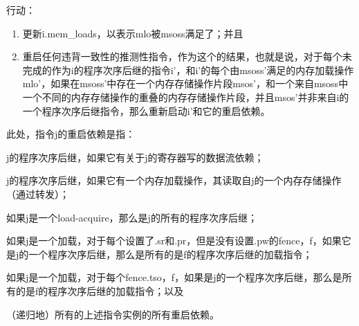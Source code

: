 行动：
\begin{enumerate}
\item 更新i.mem_loads，以表示mlo被msoss满足了；并且
\item 重启任何违背一致性的推测性指令，作为这个的结果，也就是说，对于每个未完成的作为i的程序次序后继的指令i’，和i’的每个由msoss’满足的内存加载操作mlo’，如果在msoss’中存在一个内存存储操作片段msos’，和一个来自msoss中一个不同的内存存储操作的重叠的内存存储操作片段，并且msos’并非来自i的一个程序次序后继指令，那么重新启动i’和它的重启依赖。
\end{enumerate}
此处，指令j的重启依赖是指：
\begin{tightlist}
\item j的程序次序后继，如果它有关于j的寄存器写的数据流依赖；  %
\item j的程序次序后继，如果它有一个内存加载操作，其读取自j的一个内存存储操作（通过转发）；  %
\item 如果j是一个load-acquire，那么是j的所有的程序次序后继；  %
\item 如果j是一个加载，对于每个设置了.sr和.pr，但是没有设置.pw的fence，f，如果它是j的一个程序次序后继，那么是所有的是f的程序次序后继的加载指令；  %
\item 如果j是一个加载，对于每个fence.tso，f，如果是j的一个程序次序后继，那么是所有的是f的程序次序后继的加载指令；以及  %
\item（递归地）所有的上述指令实例的所有重启依赖。  %
\end{tightlist}


